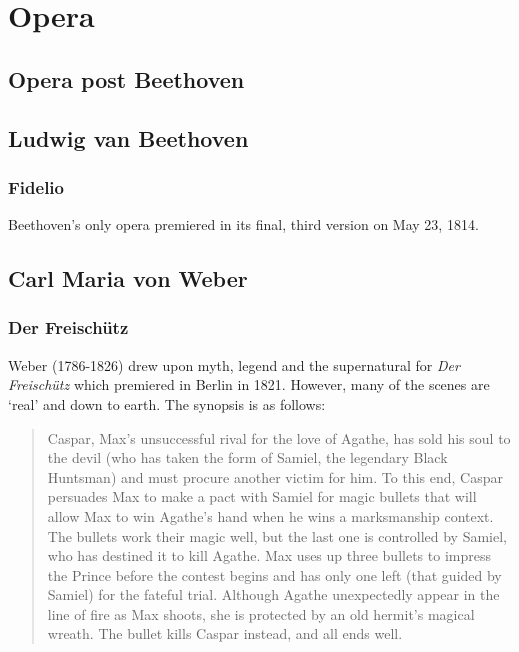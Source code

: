 
\chapter{Opera}
\label{opera}

\section{Opera post Beethoven}


\section{Ludwig van Beethoven}
\subsection{Fidelio}
Beethoven's only opera premiered in its final, third version on May 23, 1814.  

\section{Carl Maria von Weber}
\subsection{Der Freisch\"utz} 
Weber (1786-1826) drew upon myth, legend and the supernatural for \textit{Der Freisch\"utz} which premiered in Berlin in 1821. However, many of the scenes are `real' and down to earth. The synopsis is as follows:

\begin{quotation}
Caspar, Max's unsuccessful rival for the love of Agathe, has sold his soul to the devil (who has taken the form of Samiel, the legendary Black Huntsman) and must procure another victim for him. To this end, Caspar persuades Max to make a pact with Samiel for magic bullets that will allow Max to win Agathe's hand when he wins a marksmanship context. The bullets work their magic well, but the last one is controlled by Samiel, who has destined it to kill Agathe. Max uses up three bullets to impress the Prince before the contest begins and has only one left (that guided by Samiel) for the fateful trial. Although Agathe unexpectedly appear in the line of fire as Max shoots, she is protected by an old hermit's magical wreath. The bullet kills Caspar instead, and all ends well. \citep[p640]{grout1996history} 
\end{quotation}

